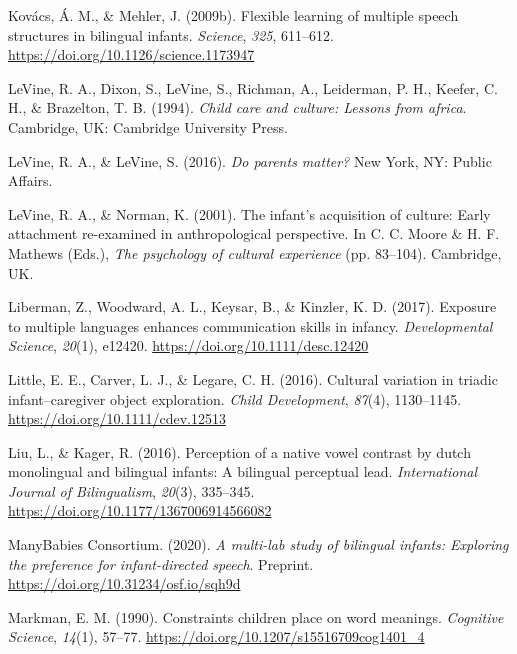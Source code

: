 \documentclass[
  english,
  ,man,floatsintext]{apa6}
\begin{document}
\leavevmode\hypertarget{ref-Kovacs_Mehler_2009a}{}%
Kovács, Á. M., \& Mehler, J. (2009b). Flexible learning of multiple speech structures in bilingual infants. \emph{Science}, \emph{325}, 611--612. \url{https://doi.org/10.1126/science.1173947}

\leavevmode\hypertarget{ref-LeVine_etal_1994}{}%
LeVine, R. A., Dixon, S., LeVine, S., Richman, A., Leiderman, P. H., Keefer, C. H., \& Brazelton, T. B. (1994). \emph{Child care and culture: Lessons from africa}. Cambridge, UK: Cambridge University Press.

\leavevmode\hypertarget{ref-LeVine_LeVine_2016}{}%
LeVine, R. A., \& LeVine, S. (2016). \emph{Do parents matter?} New York, NY: Public Affairs.

\leavevmode\hypertarget{ref-LeVine_Norman_2001}{}%
LeVine, R. A., \& Norman, K. (2001). The infant's acquisition of culture: Early attachment re-examined in anthropological perspective. In C. C. Moore \& H. F. Mathews (Eds.), \emph{The psychology of cultural experience} (pp. 83--104). Cambridge, UK.

\leavevmode\hypertarget{ref-Liberman_etal_2017}{}%
Liberman, Z., Woodward, A. L., Keysar, B., \& Kinzler, K. D. (2017). Exposure to multiple languages enhances communication skills in infancy. \emph{Developmental Science}, \emph{20}(1), e12420. \url{https://doi.org/10.1111/desc.12420}

\leavevmode\hypertarget{ref-Little_etal_2016}{}%
Little, E. E., Carver, L. J., \& Legare, C. H. (2016). Cultural variation in triadic infant--caregiver object exploration. \emph{Child Development}, \emph{87}(4), 1130--1145. \url{https://doi.org/10.1111/cdev.12513}

\leavevmode\hypertarget{ref-Liu_Kager_2016}{}%
Liu, L., \& Kager, R. (2016). Perception of a native vowel contrast by dutch monolingual and bilingual infants: A bilingual perceptual lead. \emph{International Journal of Bilingualism}, \emph{20}(3), 335--345. \url{https://doi.org/10.1177/1367006914566082}

\leavevmode\hypertarget{ref-ManyBabiesConsortium_2020}{}%
ManyBabies Consortium. (2020). \emph{A multi-lab study of bilingual infants: Exploring the preference for infant-directed speech}. Preprint. \url{https://doi.org/10.31234/osf.io/sqh9d}

\leavevmode\hypertarget{ref-Markman_1990}{}%
Markman, E. M. (1990). Constraints children place on word meanings. \emph{Cognitive Science}, \emph{14}(1), 57--77. \url{https://doi.org/10.1207/s15516709cog1401_4}
\end{document}
